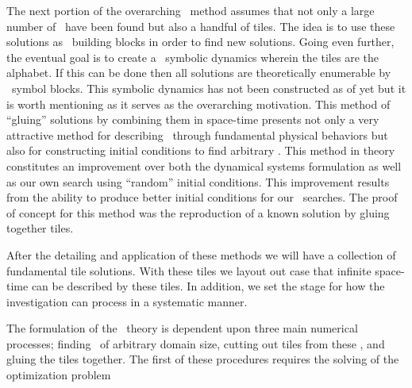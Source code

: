 The next portion of the overarching \spt\ method assumes that not only a
large number of \twots\ have been found but also a handful of tiles.
The idea is to use these solutions as \spt\ building blocks in order to find new
solutions. Going even further, the eventual goal is to create a \spt\ symbolic dynamics
wherein the tiles are the alphabet. If this can be done then all solutions
are theoretically enumerable by \spt\ symbol blocks. This symbolic dynamics
has not been constructed as of yet but it is worth mentioning as it
serves as the overarching motivation.
This method of ``gluing'' solutions by combining them in space-time
presents not only a very attractive method for describing
\twots\ through fundamental physical behaviors but also for constructing
initial conditions to find arbitrary \twots.
This method in theory constitutes an improvement over both the dynamical systems formulation
as well as our own search using ``random'' initial conditions. This improvement
results from the ability to produce better initial conditions for our \spt\ searches.
The proof of concept for this method was the reproduction of a known
solution by gluing together tiles.

After the detailing and application of these methods we will have a
collection of fundamental tile solutions. With these tiles we layout out
case that infinite space-time can be described by these tiles. In addition,
we set the stage for how the investigation can process in a systematic manner.

The formulation of the \spt\ theory is dependent upon three main numerical processes;
finding \twots\ of arbitrary domain size, cutting out tiles from these \twots,
and gluing the tiles together. The first of these procedures requires the solving
of the optimization problem

